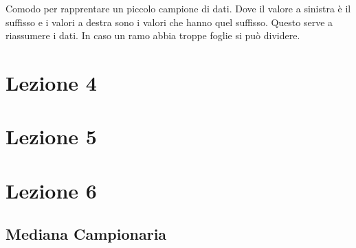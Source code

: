 \documentclass{article}
\begin{document}
\begin{minipage}[c]{0.30\textwidth}
    \centering
    \vspace{-2mm}
\end{minipage}
\hspace{2mm}
\begin{minipage}[c]{0.6\textwidth}
  Comodo per rapprentare un piccolo campione di dati. Dove il valore a sinistra è il suffisso e i valori a destra sono i valori che hanno quel suffisso. Questo serve a riassumere i dati. In caso un ramo abbia troppe foglie si può dividere.
    \vspace{-3mm}
\end{minipage}
\vspace{1mm}

\section*{Lezione 4}



\section*{Lezione 5}

\section*{Lezione 6}

\subsection*{Mediana Campionaria}
\end{document}
